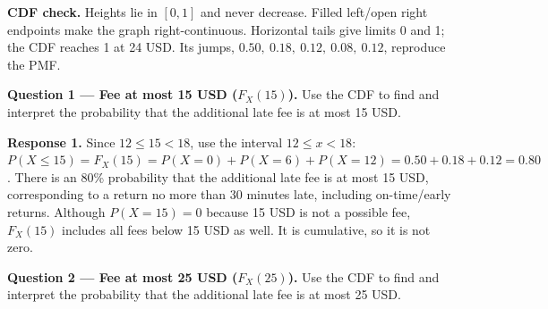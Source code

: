   \hfill%
  \begin{minipage}[t]{.60\linewidth}%
    \vspace{0pt}\centering
  \end{minipage}%
  \par
  \textbf{CDF check.} Heights lie in $[0,1]$ and never decrease. Filled left/open right endpoints make the
  graph right-continuous. Horizontal tails give limits 0 and 1; the CDF reaches 1 at 24 USD. Its jumps,
  $0.50,\ 0.18,\ 0.12,\ 0.08,\ 0.12$, reproduce the PMF.

  \textbf{Question 1 --- Fee at most 15 USD ($F_X(15)$).} Use the CDF to find and interpret the probability
  that the additional late fee is at most 15 USD.

  \textbf{Response 1.} Since $12\leq15<18$, use the interval $12\leq x<18$:
  $P(X\leq15)=F_X(15)=P(X=0)+P(X=6)+P(X=12)=0.50+0.18+0.12=0.80$.
  There is an 80\% probability that the additional late fee is at most 15 USD, corresponding to a return
  no more than 30 minutes late, including on-time/early returns. Although $P(X=15)=0$ because 15 USD is
  not a possible fee, $F_X(15)$ includes all fees below 15 USD as well. It is cumulative, so it is not zero.

  \textbf{Question 2 --- Fee at most 25 USD ($F_X(25)$).} Use the CDF to find and interpret the probability
  that the additional late fee is at most 25 USD.


